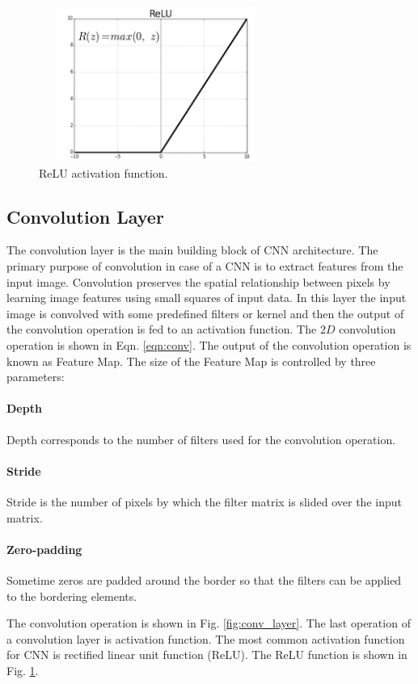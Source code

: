 \documentclass[conference]{IEEEtran}
\begin{document}
\begin{figure}[!t]
	\centerline{\includegraphics[width=3in, height=2in]{relu}}
	\caption{ReLU activation function. \cite{relu}}
	\label{fig:relu}
\end{figure} 

\subsection{Convolution Layer} 
The convolution layer is the main building block of CNN architecture. The primary purpose of convolution in case of a CNN is to extract features from the input image. Convolution preserves the spatial relationship between pixels by learning image features using small squares of input data. In this layer the input image is convolved with some predefined filters or kernel and then the output of the convolution operation is fed to an activation function. The $2D$ convolution operation is shown in Eqn. \ref{eqn:conv}. The output of the convolution operation is known as Feature Map. The size of the Feature Map is controlled by three parameters: \cite{anintuitivecnn}
\paragraph{Depth} Depth corresponds to the number of filters used for the convolution operation.
\paragraph{Stride} Stride is the number of pixels by which the filter matrix is slided over the input matrix. 
\paragraph{Zero-padding} Sometime zeros are padded around the border so that the filters can be applied to the bordering elements.

The convolution operation is shown in Fig. \ref{fig:conv_layer}. The last operation of a convolution layer is activation function. The most common activation function for CNN is rectified linear unit function (ReLU). The ReLU function is shown in Fig. \ref{fig:relu}.
\end{document}
